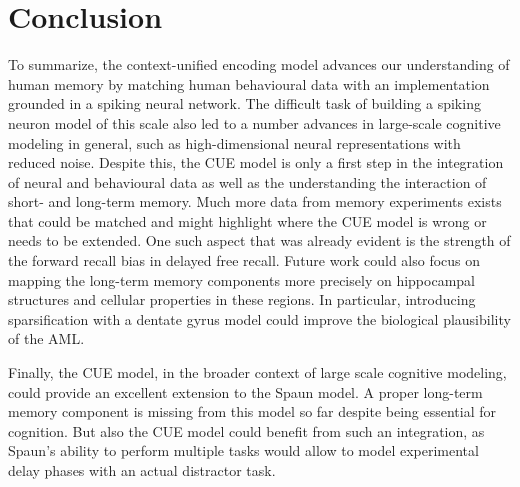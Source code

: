 \chapter{Conclusion}
To summarize, the context-unified encoding model advances our understanding of human memory by matching human behavioural data with an implementation grounded in a spiking neural network.
The difficult task of building a spiking neuron model of this scale also led to a number advances in large-scale cognitive modeling in general, such as high-dimensional neural representations with reduced noise.
Despite this, the CUE model is only a first step in the integration of neural and behavioural data as well as the understanding the interaction of short- and long-term memory.
Much more data from memory experiments exists that could be matched and might highlight where the CUE model is wrong or needs to be extended.
One such aspect that was already evident is the strength of the forward recall bias in delayed free recall.
Future work could also focus on mapping the long-term memory components more precisely on hippocampal structures and cellular properties in these regions.
In particular, introducing sparsification with a dentate gyrus model could improve the biological plausibility of the AML\@.

Finally, the CUE model, in the broader context of large scale cognitive modeling, could provide an excellent extension to the Spaun model.
A proper long-term memory component is missing from this model so far despite being essential for cognition.
But also the CUE model could benefit from such an integration, as Spaun's ability to perform multiple tasks would allow to model experimental delay phases with an actual distractor task.
